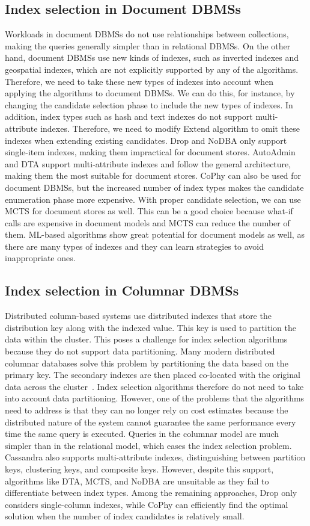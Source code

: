 \subsection{Index selection in Document DBMSs}
Workloads in document DBMSs do not use relationships between collections, making the queries generally simpler than in relational DBMSs. On the other hand, document DBMSs use new kinds of indexes, such as inverted indexes and geospatial indexes, which are not explicitly supported by any of the algorithms. Therefore, we need to take these new types of indexes into account when applying the algorithms to document DBMSs. We can do this, for instance, by changing the candidate selection phase to include the new types of indexes. In addition, index types such as hash and text indexes do not support multi-attribute indexes. Therefore, we need to modify Extend algorithm to omit these indexes when extending existing candidates. Drop and NoDBA only support single-item indexes, making them impractical for document stores. AutoAdmin and DTA support multi-attribute indexes and follow the general architecture, making them the most suitable for document stores. CoPhy can also be used for document DBMSs, but the increased number of index types makes the candidate enumeration phase more expensive. With proper candidate selection, we can use MCTS for document stores as well. This can be a good choice because what-if calls are expensive in document models and MCTS can reduce the number of them. ML-based algorithms show great potential for document models as well, as there are many types of indexes and they can learn strategies to avoid inappropriate ones.

\subsection{Index selection in Columnar DBMSs}
Distributed column-based systems use distributed indexes that store the distribution key along with the indexed value. This key is used to partition the data within the cluster. This poses a challenge for index selection algorithms because they do not support data partitioning. Many modern distributed columnar databases solve this problem by partitioning the data based on the primary key. The secondary indexes are then placed co-located with the original data across the cluster~\citep{cassandraIndexes}. Index selection algorithms therefore do not need to take into account data partitioning. However, one of the problems that the algorithms need to address is that they can no longer rely on cost estimates because the distributed nature of the system cannot guarantee the same performance every time the same query is executed. Queries in the columnar model are much simpler than in the relational model, which eases the index selection problem. Cassandra also supports multi-attribute indexes, distinguishing between partition keys, clustering keys, and composite keys. However, despite this support, algorithms like DTA, MCTS, and NoDBA are unsuitable as they fail to differentiate between index types. Among the remaining approaches, Drop only considers single-column indexes, while CoPhy can efficiently find the optimal solution when the number of index candidates is relatively small.


